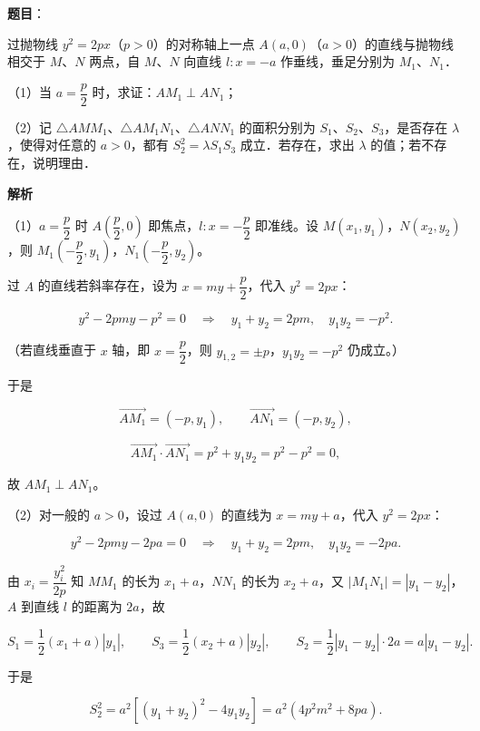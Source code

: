 \begin{answer}

\textbf{题目}：

过抛物线 $y^2=2px$（$p>0$）的对称轴上一点 $A(a,0)$（$a>0$）的直线与抛物线相交于 $M$、$N$ 两点，自 $M$、$N$ 向直线 $l:x=-a$ 作垂线，垂足分别为 $M_1$、$N_1$．

（1）当 $a=\dfrac p2$ 时，求证：$AM_1\perp AN_1$；

（2）记 $\triangle AMM_1$、$\triangle AM_1N_1$、$\triangle ANN_1$ 的面积分别为 $S_1$、$S_2$、$S_3$，是否存在 $\lambda$，使得对任意的 $a>0$，都有 $S_2^2=\lambda S_1S_3$ 成立．若存在，求出 $\lambda$ 的值；若不存在，说明理由．

\textbf{解析}

（1）$a=\dfrac p2$ 时 $A\left(\dfrac p2,0\right)$ 即焦点，$l:x=-\dfrac p2$ 即准线。设 $M(x_1,y_1)$，$N(x_2,y_2)$，则 $M_1\left(-\dfrac p2,y_1\right)$，$N_1\left(-\dfrac p2,y_2\right)$。

过 $A$ 的直线若斜率存在，设为 $x=my+\dfrac p2$，代入 $y^2=2px$：

\nopagebreak[4]
\[y^2-2pmy-p^2=0\quad\Longrightarrow\quad y_1+y_2=2pm,\quad y_1y_2=-p^2.\]

（若直线垂直于 $x$ 轴，即 $x=\dfrac p2$，则 $y_{1,2}=\pm p$，$y_1y_2=-p^2$ 仍成立。）

于是

\nopagebreak[4]
\[\overrightarrow{AM_1}=\left(-p,y_1\right),\qquad\overrightarrow{AN_1}=\left(-p,y_2\right),\]

\nopagebreak[4]
\[\overrightarrow{AM_1}\cdot\overrightarrow{AN_1}=p^2+y_1y_2=p^2-p^2=0,\]

故 $AM_1\perp AN_1$。

（2）对一般的 $a>0$，设过 $A(a,0)$ 的直线为 $x=my+a$，代入 $y^2=2px$：

\nopagebreak[4]
\[y^2-2pmy-2pa=0\quad\Longrightarrow\quad y_1+y_2=2pm,\quad y_1y_2=-2pa.\]

由 $x_i=\dfrac{y_i^2}{2p}$ 知 $MM_1$ 的长为 $x_1+a$，$NN_1$ 的长为 $x_2+a$，又 $|M_1N_1|=|y_1-y_2|$，$A$ 到直线 $l$ 的距离为 $2a$，故

\nopagebreak[4]
\[S_1=\frac12\left(x_1+a\right)|y_1|,\qquad
S_3=\frac12\left(x_2+a\right)|y_2|,\qquad
S_2=\frac12|y_1-y_2|\cdot2a=a|y_1-y_2|.\]

于是

\nopagebreak[4]
\[S_2^2=a^2\left[(y_1+y_2)^2-4y_1y_2\right]=a^2\left(4p^2m^2+8pa\right).\]


\end{answer}
